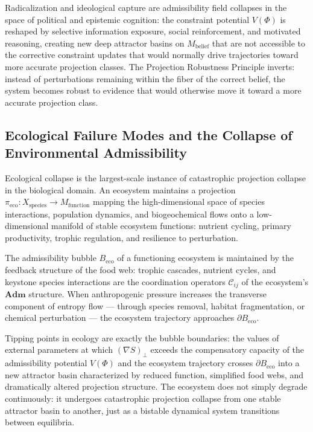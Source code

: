 \documentclass[12pt, a4paper]{article}
\theoremstyle{essaystyle}
\begin{document}
Radicalization and ideological capture are admissibility field collapses in the
space of political and epistemic cognition: the constraint potential $V(\Phi)$ is
reshaped by selective information exposure, social reinforcement, and motivated
reasoning, creating new deep attractor basins on $M_{\mathrm{belief}}$ that are
not accessible to the corrective constraint updates that would normally drive
trajectories toward more accurate projection classes. The Projection Robustness
Principle inverts: instead of perturbations remaining within the fiber of the correct
belief, the system becomes robust to evidence that would otherwise move it toward
a more accurate projection class.

\subsection{Ecological Failure Modes and the Collapse of Environmental Admissibility}

Ecological collapse is the largest-scale instance of catastrophic projection collapse
in the biological domain. An ecosystem maintains a projection $\pi_{\mathrm{eco}} :
X_{\mathrm{species}} \to M_{\mathrm{function}}$ mapping the high-dimensional space
of species interactions, population dynamics, and biogeochemical flows onto a
low-dimensional manifold of stable ecosystem functions: nutrient cycling, primary
productivity, trophic regulation, and resilience to perturbation.

The admissibility bubble $B_{\mathrm{eco}}$ of a functioning ecosystem is maintained
by the feedback structure of the food web: trophic cascades, nutrient cycles, and
keystone species interactions are the coordination operators $\mathcal{C}_{ij}$ of
the ecosystem's $\mathbf{Adm}$ structure. When anthropogenic pressure increases the
transverse component of entropy flow --- through species removal, habitat fragmentation,
or chemical perturbation --- the ecosystem trajectory approaches $\partial B_{\mathrm{eco}}$.

Tipping points in ecology are exactly the bubble boundaries: the values of external
parameters at which $(\nabla S)_\perp$ exceeds the compensatory capacity of the
admissibility potential $V(\Phi)$ and the ecosystem trajectory crosses
$\partial B_{\mathrm{eco}}$ into a new attractor basin characterized by reduced
function, simplified food webs, and dramatically altered projection structure.
The ecosystem does not simply degrade continuously: it undergoes catastrophic
projection collapse from one stable attractor basin to another, just as a bistable
dynamical system transitions between equilibria.
\end{document}

